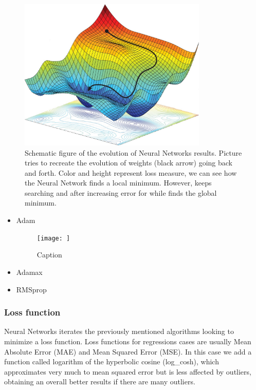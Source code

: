 \documentclass[openany]{article}
\begin{document}
\begin{figure}[!h]
    \centering
    \includegraphics[width=0.8\textwidth]{LRMinimun.png}
    \caption{Schematic figure of the evolution of Neural Networks results. Picture tries to recreate the evolution of weights (black arrow) going back and forth. Color and height represent loss measure, we can see how the Neural Network finds a local minimum. However, keeps searching and after increasing error for while finds the global minimum. }
    \label{ig:my_label}
\end{figure}

\begin{itemize}
    \item Adam
    
    \begin{figure}[!h]
        \centering
        \texttt{[image: ]}
        \caption{Caption}
        \label{fig:my_label}
    \end{figure}
    
    \item Adamax
    
    \item RMSprop
    
\end{itemize}

\subsubsection*{Loss function}

Neural Networks iterates the previously mentioned algorithms looking to minimize a loss function. Loss functions for regressions cases are usually Mean Absolute Error (MAE) and Mean Squared Error (MSE). In this case we add a function called logarithm of the hyperbolic cosine (log\_cosh), which approximates very much to mean squared error but is less affected by outliers, obtaining an overall better results if there are many outliers.
\end{document}
